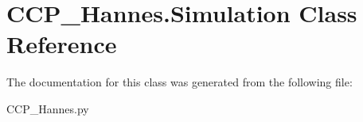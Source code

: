 \hypertarget{class_c_c_p___hannes_1_1_simulation}{}\section{C\+C\+P\+\_\+\+Hannes.\+Simulation Class Reference}
\label{class_c_c_p___hannes_1_1_simulation}


The documentation for this class was generated from the following file\+:\begin{DoxyCompactItemize}
\item 
C\+C\+P\+\_\+\+Hannes.\+py\end{DoxyCompactItemize}
